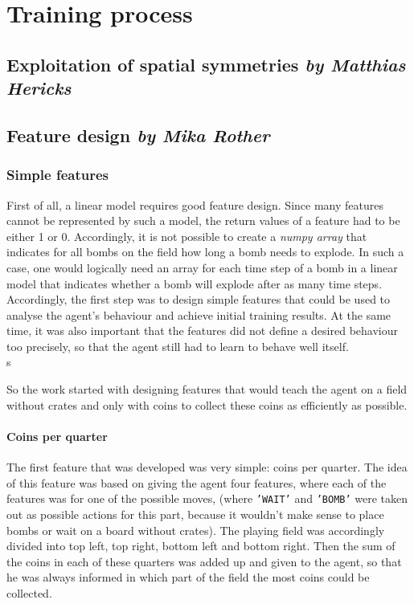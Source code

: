 \chapter{Training process}

\section[Exploitation of spatial symmetries]{Exploitation of spatial symmetries \hfill \small \normalfont\textit{by Matthias Hericks}}



\section[Feature design]{Feature design \hfill \small \normalfont\textit{by Mika Rother}}
\subsection{Simple features}
First of all, a linear model requires good feature design. Since many features cannot be represented by such a model, the return values of a feature had to be either 1 or 0. Accordingly, it is not possible to create a \textit{numpy array} that indicates for all bombs on the field how long a bomb needs to explode. In such a case, one would logically need an array for each time step of a bomb in a linear model that indicates whether a bomb will explode after as many time steps.
\\

Accordingly, the first step was to design simple features that could be used to analyse the agent's behaviour and achieve initial training results. At the same time, it was also important that the features did not define a desired behaviour too precisely, so that the agent still had to learn to behave well itself. 
\\s

So the work started with designing features that would teach the agent on a field without crates and only with coins to collect these coins as efficiently as possible.

\subsubsection*{Coins per quarter}
The first feature that was developed was very simple: coins per quarter. The idea of this feature was based on giving the agent four features, where each of the features was for one of the possible moves, (where \texttt{'WAIT'} and \texttt{'BOMB'} were taken out as possible actions for this part, because it wouldn't make sense to place bombs or wait on a board without crates). The playing field was accordingly divided into top left, top right, bottom left and bottom right. Then the sum of the coins in each of these quarters was added up and given to the agent, so that he was always informed in which part of the field the most coins could be collected. 
\\

